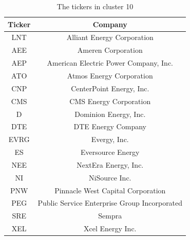 \documentclass[10pt]{article}
\begin{document}
\begin{table}
    \centering
    \begin{tabular}{|c|c|}
        \hline 
        Ticker & Company \\
        \hline
        LNT & Alliant Energy Corporation \\
        AEE & Ameren Corporation \\
        AEP & American Electric Power Company, Inc. \\
        ATO & Atmos Energy Corporation \\
        CNP & CenterPoint Energy, Inc. \\
        CMS & CMS Energy Corporation \\
        D & Dominion Energy, Inc. \\
        DTE & DTE Energy Company \\
        EVRG & Evergy, Inc. \\
        ES & Eversource Energy \\
        NEE & NextEra Energy, Inc. \\
        NI & NiSource Inc. \\
        PNW & Pinnacle West Capital Corporation \\
        PEG & Public Service Enterprise Group Incorporated \\
        SRE & Sempra \\
        XEL & Xcel Energy Inc. \\
        \hline
    \end{tabular}
    \caption{The tickers in cluster 10}
    \label{tab:clusters10}
\end{table}
\end{document}
